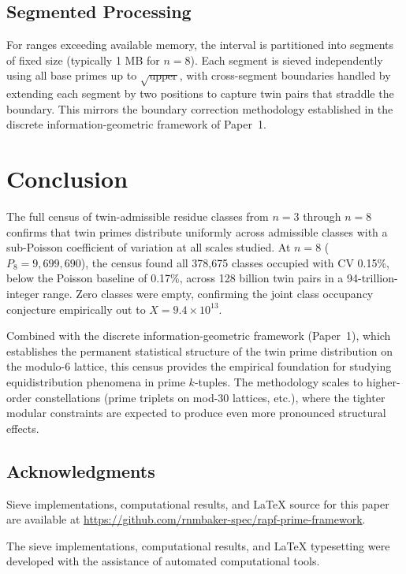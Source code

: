 \documentclass[11pt]{article}
\begin{document}
\subsection{Segmented Processing}

For ranges exceeding available memory, the interval is partitioned into segments of fixed size (typically 1 MB for $n=8$). Each segment is sieved independently using all base primes up to $\sqrt{\text{upper}}$, with cross-segment boundaries handled by extending each segment by two positions to capture twin pairs that straddle the boundary. This mirrors the boundary correction methodology established in the discrete information-geometric framework of Paper~1.

\section{Conclusion}
\label{sec:conclusion}

The full census of twin-admissible residue classes from $n=3$ through $n=8$ confirms that twin primes distribute uniformly across admissible classes with a sub-Poisson coefficient of variation at all scales studied. At $n=8$ ($P_8 = 9{,}699{,}690$), the census found all 378{,}675 classes occupied with CV 0.15\%, below the Poisson baseline of 0.17\%, across 128 billion twin pairs in a 94-trillion-integer range. Zero classes were empty, confirming the joint class occupancy conjecture empirically out to $X = 9.4 \times 10^{13}$.

Combined with the discrete information-geometric framework (Paper~1), which establishes the permanent statistical structure of the twin prime distribution on the modulo-6 lattice, this census provides the empirical foundation for studying equidistribution phenomena in prime $k$-tuples. The methodology scales to higher-order constellations (prime triplets on mod-30 lattices, etc.), where the tighter modular constraints are expected to produce even more pronounced structural effects.

\subsection*{Acknowledgments}

Sieve implementations, computational results, and LaTeX source for this paper are available at \url{https://github.com/rnmbaker-spec/rapf-prime-framework}.

The sieve implementations, computational results, and LaTeX typesetting were developed with the assistance of automated computational tools.
\end{document}
